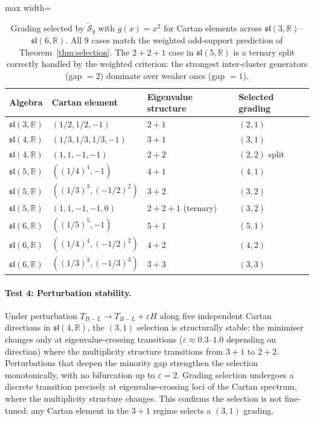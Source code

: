 \documentclass[11pt]{article}
\theoremstyle{plain}
\theoremstyle{definition}
\theoremstyle{remark}
\newcommand{\sln}[1]{\mathfrak{sl}(#1,\mathbb{R})}
\newcommand{\TBL}{T_{B\!-\!L}}
\begin{document}
\begin{table}[h]
\centering\small
\begin{adjustbox}{max width=\linewidth}\begin{tabular}{@{}llll@{}}
\toprule
Algebra & Cartan element & Eigenvalue structure & Selected grading \\
\midrule
$\sln{3}$ & $(1/2, 1/2, -1)$ & $2+1$ & $(2,1)$ \\
$\sln{4}$ & $(1/3, 1/3, 1/3, -1)$ & $3+1$ & $(3,1)$ \\
$\sln{4}$ & $(1, 1, -1, -1)$ & $2+2$ & $(2,2)$ split \\
$\sln{5}$ & $((1/4)^4, -1)$ & $4+1$ & $(4,1)$ \\
$\sln{5}$ & $((1/3)^3, (-1/2)^2)$ & $3+2$ & $(3,2)$ \\
$\sln{5}$ & $(1, 1, -1, -1, 0)$ & $2+2+1$ (ternary) & $(3,2)$ \\
$\sln{6}$ & $((1/5)^5, -1)$ & $5+1$ & $(5,1)$ \\
$\sln{6}$ & $((1/4)^4, (-1/2)^2)$ & $4+2$ & $(4,2)$ \\
$\sln{6}$ & $((1/3)^3, (-1/3)^3)$ & $3+3$ & $(3,3)$ \\
\bottomrule
\end{tabular}\end{adjustbox}
\caption{Grading selected by $\widetilde{\mathcal{S}}_g$ with $g(x) = x^2$
for Cartan elements
across $\sln{3}$--$\sln{6}$.  All $9$ cases match the
weighted odd-support prediction of Theorem~\ref{thm:selection}.
The $2{+}2{+}1$ case in $\sln{5}$ is a ternary split correctly
handled by the weighted criterion: the strongest inter-cluster
generators (gap $= 2$) dominate over weaker ones (gap $= 1$).}
\label{tab:generators}
\end{table}

\paragraph{Test 4: Perturbation stability.}
Under perturbation $\TBL \to \TBL + \varepsilon H$ along five
independent Cartan directions in $\sln{4}$, the $(3,1)$ selection
is structurally stable: the minimiser changes only at
eigenvalue-crossing transitions
($\varepsilon \approx 0.3$--$1.0$ depending on direction) where the
multiplicity structure transitions from $3{+}1$ to $2{+}2$.
Perturbations that deepen the minority gap strengthen the selection
monotonically, with no bifurcation up to $\varepsilon = 2$.  Grading
selection undergoes a discrete transition precisely at
eigenvalue-crossing loci of the Cartan spectrum, where the
multiplicity structure changes.  This confirms the selection is not
fine-tuned: any Cartan element in the $3{+}1$ regime selects
a $(3,1)$ grading.
\end{document}
